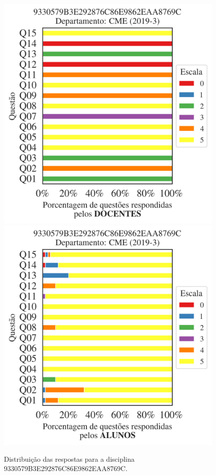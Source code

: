 \documentclass[a4paper,10pt]{article}
\begin{document}
\begin{figure}[h]
\centering
\includegraphics[width=0.485\linewidth]{analise_disciplina_departamento_CME_9330579B3E292876C86E9862EAA8769C_docentes.png}
\includegraphics[width=0.485\linewidth]{analise_disciplina_departamento_CME_9330579B3E292876C86E9862EAA8769C_alunos.png}
\caption{\label{fig:analise_geral_departamento}                Distribuição das respostas para a disciplina 9330579B3E292876C86E9862EAA8769C. }
\end{figure}
\end{document}
